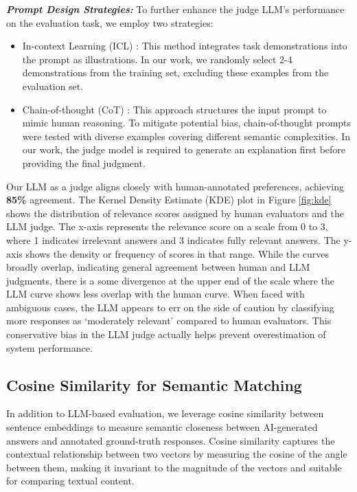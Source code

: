 \textbf{\textit{Prompt Design Strategies:}} To further enhance the judge LLM's performance on the evaluation task, we employ two strategies: 

\begin{itemize}
    \item In-context Learning (ICL) \cite{dong2022survey}: This method integrates task demonstrations into the prompt as illustrations. In our work, we randomly select 2-4 demonstrations from the training set, excluding these examples from the evaluation set.

    \item Chain-of-thought (CoT) \cite{wei2022chain}: This approach structures the input prompt to mimic human reasoning. To mitigate potential bias, chain-of-thought prompts were tested with diverse examples covering different semantic complexities. In our work, the judge model is required to generate an explanation first before providing the final judgment.
\end{itemize}


Our LLM as a judge aligns closely with human-annotated preferences, achieving \textbf{85\% }agreement. The Kernel Density Estimate (KDE) plot in Figure \ref{fig:kde} shows the distribution of relevance scores assigned by human evaluators and the LLM judge. The x-axis represents the relevance score on a scale from 0 to 3, where 1 indicates irrelevant answers and 3 indicates fully relevant answers. The y-axis shows the density or frequency of scores in that range. While the curves broadly overlap, indicating general agreement between human and LLM judgments, there is a some divergence at the upper end of the scale where the LLM curve shows less overlap with the human curve. When faced with ambiguous cases, the LLM appears to err on the side of caution by classifying more responses as `moderately relevant' compared to human evaluators. This conservative bias in the LLM judge actually helps prevent overestimation of system performance.

\subsection{Cosine Similarity for Semantic Matching}

In addition to LLM-based evaluation, we leverage cosine similarity \cite{gomaa2013survey} between sentence embeddings to measure semantic closeness between AI-generated answers and annotated ground-truth responses. Cosine similarity captures the contextual relationship between two vectors by measuring the cosine of the angle between them, making it invariant to the magnitude of the vectors and suitable for comparing textual content.


